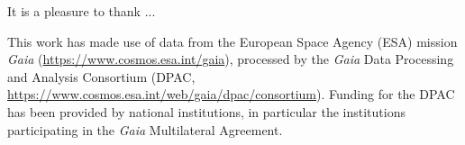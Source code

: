 \begin{acknowledgements}

It is a pleasure to thank ...



This work has made use of data from the European Space Agency (ESA) mission
{\it Gaia} (\url{https://www.cosmos.esa.int/gaia}), processed by the {\it Gaia}
Data Processing and Analysis Consortium (DPAC,
\url{https://www.cosmos.esa.int/web/gaia/dpac/consortium}). Funding for the DPAC
has been provided by national institutions, in particular the institutions
participating in the {\it Gaia} Multilateral Agreement.

\end{acknowledgements}






